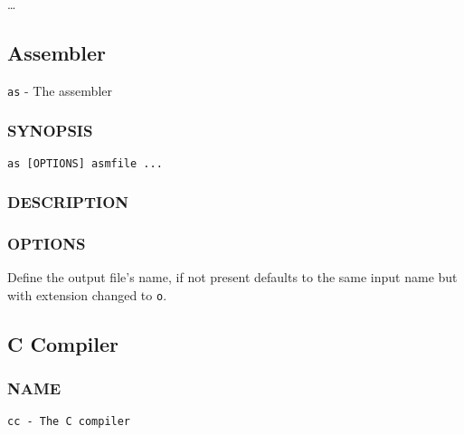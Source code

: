 \begin{description}[style=multiline,leftmargin5cm]
   \item[\texttt{\detokenize{LD_LIBRARY_PATH}}]
   \ldots{}
\end{description}

\newpage
\subsection{Assembler}

\texttt{as} - The assembler

\subsubsection*{SYNOPSIS}

\begin{lstlisting}[style=bash]
as [OPTIONS] asmfile ...
\end{lstlisting}

\subsubsection*{DESCRIPTION}


\subsubsection*{OPTIONS}

\begin{description}[style=multiline,leftmargin=5cm]
   \item[\texttt{-o <name>}]
   Define the output file's name,
   if not present defaults to the same input name but with
   extension changed to \texttt{o}.
\end{description}

\newpage
\subsection{C Compiler}

\subsubsection*{NAME}

\begin{lstlisting}[style=bash]
cc - The C compiler
\end{lstlisting}

